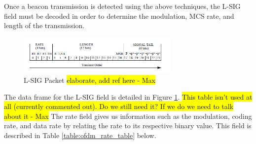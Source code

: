 Once a beacon transmission is detected using the above techniques, the L-SIG field must be decoded in order to determine the modulation, MCS rate, and length of the transmission.
\begin{figure}[ht!]
	\centering
	\includegraphics[width=0.70\textwidth]{img/lsig_packet}
	\caption{L-SIG Packet \hl{elaborate, add ref here - Max}}
	\label{fig:lsig_packet}
\end{figure}\par
 The data frame for the L-SIG field is detailed in Figure \ref{fig:lsig_packet}.
\hl{This table isn't used at all (currently commented out). Do we still need it? If we do we need to talk about it - Max}
The rate field gives us information such as the modulation, coding rate, and data rate by relating the rate to its respective binary value. This field is described in Table \ref{table:ofdm_rate_table} below.

